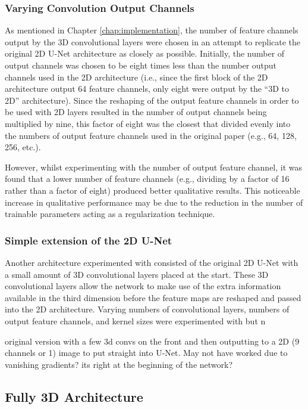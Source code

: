 \subsubsection{Varying Convolution Output Channels}

As mentioned in Chapter \ref{chap:implementation}, the number of feature channels output by the 3D convolutional layers were chosen in an attempt to replicate the original 2D U-Net architecture as closely as possible. Initially, the number of output channels was chosen to be eight times less than the number output channels used in the 2D architecture (i.e., since the first block of the 2D architecture output 64 feature channels, only eight were output by the ``3D to 2D'' architecture). Since the reshaping of the output feature channels in order to be used with 2D layers resulted in the number of output channels being multiplied by nine, this factor of eight was the closest that divided evenly into the numbers of output feature channels used in the original paper (e.g., 64, 128, 256, etc.).

However, whilst experimenting with the number of output feature channel, it was found that a lower number of feature channels (e.g., dividing by a factor of 16 rather than a factor of eight) produced better qualitative results. This noticeable increase in qualitative performance may be due to the reduction in the number of trainable parameters acting as a regularization technique.

\subsubsection{Simple extension of the 2D U-Net}

Another architecture experimented with consisted of the original 2D U-Net with a small amount of 3D convolutional layers placed at the start. These 3D convolutional layers allow the network to make use of the extra information available in the third dimension before the feature maps are reshaped and passed into the 2D architecture. Varying numbers of convolutional layers, numbers of output feature channels, and kernel sizes were experimented with but n

original version with a few 3d convs on the front and then outputting to a 2D (9 channels or 1) image to put straight into U-Net. May not have worked due to vanishing gradients? its right at the beginning of the network?

\subsection{Fully 3D Architecture}

